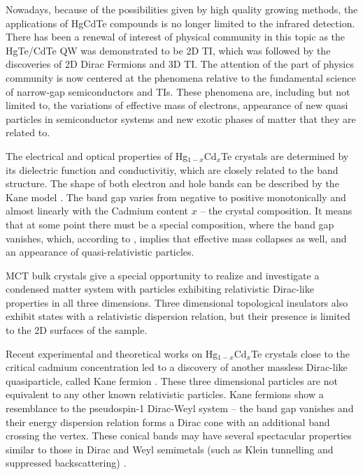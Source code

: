\documentclass[titlepage,a4paper]{book}
\begin{document}
Nowadays, because of the possibilities given by high quality growing methods, the applications of HgCdTe compounds is no longer limited to the infrared detection. There has been a renewal of interest of physical community in this topic as the HgTe/CdTe QW was demonstrated to be 2D TI, which was followed by the discoveries of 2D Dirac Fermions and 3D TI. The attention of the part of physics community is now centered at the phenomena relative to the fundamental science of narrow-gap semiconductors and TIs. These phenomena are, including but not limited to, the variations of effective mass of electrons, appearance of new quasi particles in semiconductor systems and new exotic phases of matter that they are related to. 

The electrical and optical properties of Hg$_{1-x}$Cd$_x$Te crystals are determined by its dielectric function and conductivitiy, which are closely related to the band structure. The shape of both electron and hole bands can be described by the Kane model \cite{Kane_Model}. The band gap varies from negative to positive monotonically and almost linearly with the Cadmium content $x$ -- the crystal composition. It means that at some point there must be a special composition, where the band gap vanishes, which, according to \cite{Zawadzki_Topology}, implies that effective mass collapses as well, and an appearance of quasi-relativistic particles. 

MCT bulk crystals give a special opportunity to realize and investigate a condensed matter system with particles exhibiting relativistic Dirac-like properties in all three dimensions. Three dimensional topological insulators also exhibit states with a relativistic dispersion relation, but their presence is limited to the 2D surfaces of the sample.

Recent experimental \cite{Orlita_MCT} and theoretical \cite{Malcolm_MCT} works on Hg$_{1-x}$Cd$_x$Te crystals close to the critical cadmium concentration led to a discovery of another massless Dirac-like quasiparticle, called Kane fermion \cite{Orlita_MCT}. These three dimensional particles are not equivalent to any other known relativistic particles. Kane fermions show a resemblance to the pseudospin-1 Dirac-Weyl system \cite{Malcolm_MCT} -- the band gap vanishes \cite{Weiler_MCT} and their energy dispersion relation forms a Dirac cone with an additional band crossing the vertex. These conical bands may have several spectacular properties similar to those in Dirac and Weyl semimetals (such as Klein tunnelling and suppressed backscattering) \cite{Orlita_MCT}. 
\end{document}

